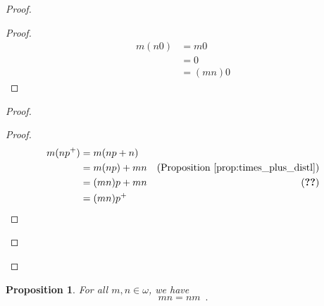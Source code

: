 \documentclass{report}
\let\qed\relax
\newtheorem{prop}[ax]{Proposition}
\theoremstyle{definition}
\begin{document}
\begin{proof}
\pf
{}
\begin{proof}
	\pf
	\begin{align*}
		m(n0) & = m0 \\
		& = 0 \\
		& = (mn)0
	\end{align*}
\end{proof}
\begin{proof}
	\begin{proof}
		\pf
		\begin{align*}
			m(np^+) & = m(np + n) \\
			& = m(np) + mn & (\text{Proposition \ref{prop:times_plus_distl}}) \\
			& = (mn)p + mn & (\text{\stepref{b}}) \\
			& = (mn)p^+
		\end{align*}
	\end{proof}
\end{proof}
\qed
\end{proof}

\begin{prop}
For all $m,n \in \omega$, we have
\[ mn = nm \enspace . \]
\end{prop}
\end{document}
